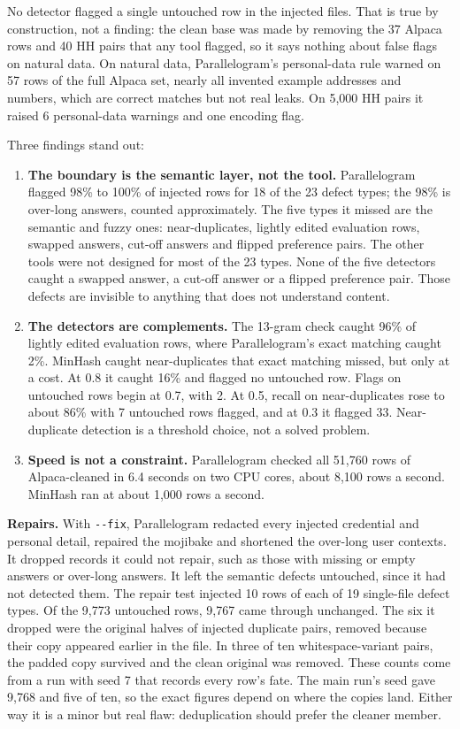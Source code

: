 No detector flagged a single untouched row in the injected files. That is true by construction, not a finding: the clean base was made by removing the 37 Alpaca rows and 40 HH pairs that any tool flagged, so it says nothing about false flags on natural data. On natural data, Parallelogram's personal-data rule warned on 57 rows of the full Alpaca set, nearly all invented example addresses and numbers, which are correct matches but not real leaks. On 5,000 HH pairs it raised 6 personal-data warnings and one encoding flag.

Three findings stand out:

\begin{enumerate}
\def\labelenumi{\arabic{enumi}.}
\tightlist
\item
  \textbf{The boundary is the semantic layer, not the tool.} Parallelogram flagged 98\% to 100\% of injected rows for 18 of the 23 defect types; the 98\% is over-long answers, counted approximately. The five types it missed are the semantic and fuzzy ones: near-duplicates, lightly edited evaluation rows, swapped answers, cut-off answers and flipped preference pairs. The other tools were not designed for most of the 23 types. None of the five detectors caught a swapped answer, a cut-off answer or a flipped preference pair. Those defects are invisible to anything that does not understand content.
\item
  \textbf{The detectors are complements.} The 13-gram check caught 96\% of lightly edited evaluation rows, where Parallelogram's exact matching caught 2\%. MinHash caught near-duplicates that exact matching missed, but only at a cost. At 0.8 it caught 16\% and flagged no untouched row. Flags on untouched rows begin at 0.7, with 2. At 0.5, recall on near-duplicates rose to about 86\% with 7 untouched rows flagged, and at 0.3 it flagged 33. Near-duplicate detection is a threshold choice, not a solved problem.
\item
  \textbf{Speed is not a constraint.} Parallelogram checked all 51,760 rows of Alpaca-cleaned in 6.4 seconds on two CPU cores, about 8,100 rows a second. MinHash ran at about 1,000 rows a second.
\end{enumerate}

\textbf{Repairs.} With \texttt{-\/-fix}, Parallelogram redacted every injected credential and personal detail, repaired the mojibake and shortened the over-long user contexts. It dropped records it could not repair, such as those with missing or empty answers or over-long answers. It left the semantic defects untouched, since it had not detected them. The repair test injected 10 rows of each of 19 single-file defect types. Of the 9,773 untouched rows, 9,767 came through unchanged. The six it dropped were the original halves of injected duplicate pairs, removed because their copy appeared earlier in the file. In three of ten whitespace-variant pairs, the padded copy survived and the clean original was removed. These counts come from a run with seed 7 that records every row's fate. The main run's seed gave 9,768 and five of ten, so the exact figures depend on where the copies land. Either way it is a minor but real flaw: deduplication should prefer the cleaner member.

